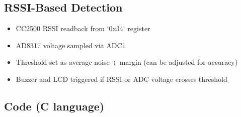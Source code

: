 \documentclass[12pt]{article}
\begin{document}
\subsection{RSSI-Based Detection}
\begin{itemize}
    \item CC2500 RSSI readback from `0x34` register
    \item AD8317 voltage sampled via ADC1
    \item Threshold set as average noise + margin (can be adjusted for accuracy)
    \item Buzzer and LCD triggered if RSSI or ADC voltage crosses threshold
\end{itemize}

\subsection{Code (C language)}

\vspace{1em}
\end{document}
